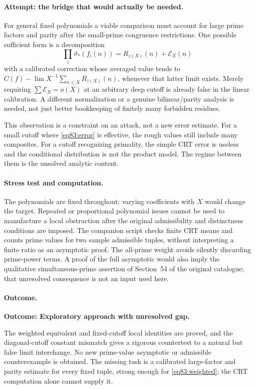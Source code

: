 \documentclass[11pt,a4paper]{article}
\numberwithin{equation}{section}
\begin{document}
\paragraph{Attempt: the bridge that would actually be needed.}
For general fixed polynomials a viable comparison must account for large
prime factors and parity after the small-prime congruence restrictions.
One possible sufficient form is a decomposition
\[
 \prod_i\vartheta_*(f_i(n))=R_{z(X)}(n)+\mathcal E_X(n)
\]
with a calibrated correction whose averaged value tends to
$C(f)-\lim X^{-1}\sum_{n\leq X}R_{z(X)}(n)$, whenever that latter limit
exists. Merely requiring $\sum\mathcal E_X=o(X)$ at an arbitrary deep
cutoff is already false in the linear calibration. A different normalization
or a genuine bilinear/parity analysis is needed, not just better bookkeeping
of finitely many forbidden residues.

This observation is a constraint on an attack, not a new error estimate.
For a small cutoff where \eqref{eq83:error} is effective, the rough values
still include many composites. For a cutoff recognizing primality, the
simple CRT error is useless and the conditional distribution is not the
product model. The regime between them is the unsolved analytic content.

\paragraph{Stress test and computation.}
The polynomials are fixed throughout; varying coefficients with $X$ would
change the target. Repeated or proportional polynomial issues cannot be
used to manufacture a local obstruction after the original admissibility
and distinctness conditions are imposed. The companion script checks
finite CRT means and counts prime values for two sample admissible tuples,
without interpreting a finite ratio as an asymptotic proof. The all-prime
weight avoids silently discarding prime-power terms. A proof of the full
asymptotic would also imply the qualitative simultaneous-prime assertion
of Section~54 of the original catalogue; that unresolved consequence is
not an input used here.

\paragraph{Outcome.}
\textbf{Outcome: Exploratory approach with unresolved gap.}

The weighted equivalent and fixed-cutoff local identities are proved, and
the diagonal-cutoff constant mismatch gives a rigorous countertest to a
natural but false limit interchange. No new prime-value asymptotic or
admissible counterexample is obtained. The missing task is a calibrated
large-factor and parity estimate for every fixed tuple, strong enough for
\eqref{eq83:weighted}; the CRT computation alone cannot supply it.
\end{document}
